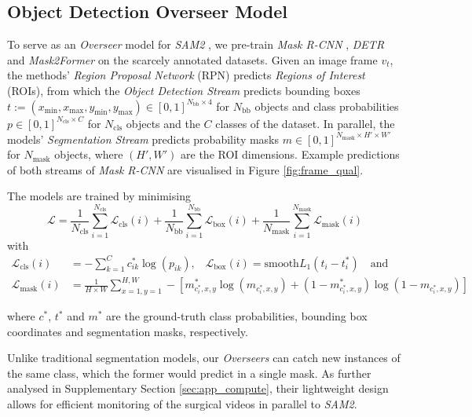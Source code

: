\subsection{Object Detection Overseer Model}
To serve as an \emph{Overseer} model for \emph{SAM2} \cite{ravi2024sam}, we pre-train \emph{Mask R-CNN} \cite{he2017mask}, \emph{DETR} \cite{carion2020end} and \emph{Mask2Former} \cite{cheng2022masked} on the scarcely annotated datasets. Given an image frame $v_t$, the methods' \emph{Region Proposal Network} (RPN) predicts \emph{Regions of Interest} (ROIs), from which the \emph{Object Detection Stream} predicts bounding boxes $t := (x_\text{min}, x_\text{max}, y_\text{min}, y_\text{max}) \in [0,1]^{N_\text{bb} \times 4}$ for $N_\text{bb}$ objects and class probabilities $p \in [0,1]^{N_\text{cls} \times C}$ for $N_\text{cls}$ objects and the $C$ classes of the dataset. In parallel, the models' \emph{Segmentation Stream} predicts probability masks $m \in [0,1]^{N_\text{mask} \times H' \times W'}$ for $N_\text{mask}$ objects, where $(H',W')$ are the ROI dimensions. Example predictions of both streams of \emph{Mask R-CNN} are visualised in Figure \ref{fig:frame_qual}.

The models are trained by minimising
\begin{equation}
    \mathcal{L} = \frac{1}{N_\text{cls}} \sum_{i=1}^{N_\text{cls}} \mathcal{L}_\text{cls}(i) + \frac{1}{N_\text{bb}} \sum_{i=1}^{N_\text{bb}} \mathcal{L}_\text{box}(i) + \frac{1}{N_\text{mask}} \sum_{i=1}^{N_\text{mask}} \mathcal{L}_\text{mask}(i)
\end{equation}
with
\begin{align}
    \mathcal{L}_\text{cls}(i) &=  - \sum_{k=1}^C c^*_{ik}\log(p_{ik}) \text{,}\quad \mathcal{L}_\text{box}(i) = \text{smooth}{L_1}(t_i - t^*_i) \quad\text{and}\\
    \mathcal{L}_\text{mask}(i) &=  \frac{1}{H \times W} \sum_{x=1,y=1}^{H,W} - [m^*_{c^*_i,x,y}\log(m_{c^*_i,x,y}) + (1-m^*_{c^*_i,x,y} ) \log(1-m_{c^*_i,x,y})]
\end{align}

where $c^*$, $t^*$ and $m^*$ are the ground-truth class probabilities, bounding box coordinates and segmentation masks, respectively.

Unlike traditional segmentation models, our \emph{Overseers} can catch new instances of the same class, which the former would predict in a single mask. As further analysed in Supplementary Section \ref{sec:app_compute}, their lightweight design allows for efficient monitoring of the surgical videos in parallel to \emph{SAM2}.

